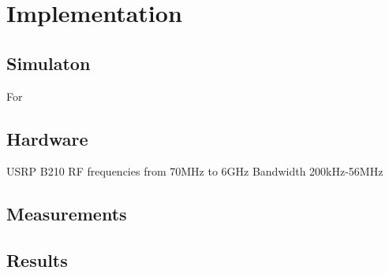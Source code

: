 
\chapter{Implementation}

\section{Simulaton}
 For 
\section{Hardware}
 USRP B210 
 RF frequencies from 70MHz to 6GHz
 Bandwidth 200kHz-56MHz
\section{Measurements}
\section{Results}
